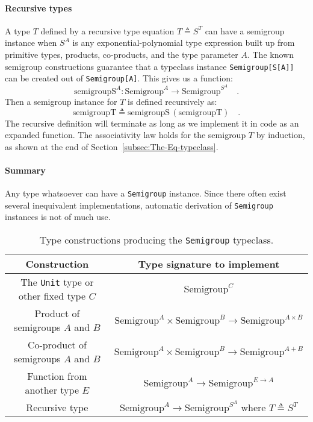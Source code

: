\paragraph{Recursive types}

A type $T$ defined by a recursive type equation $T\triangleq S^{T}$
can have a semigroup instance when $S^{A}$ is any exponential-polynomial
type expression built up from primitive types, products, co-products,
and the type parameter $A$. The known semigroup constructions guarantee
that a typeclass instance \lstinline!Semigroup[S[A]]! can be created
out of \lstinline!Semigroup[A]!. This gives us a function:
\[
\text{semigroupS}^{A}:\text{Semigroup}^{A}\rightarrow\text{Semigroup}^{S^{A}}\quad.
\]
Then a semigroup instance for $T$ is defined recursively as:
\[
\text{semigroupT}\triangleq\text{semigroupS}\,(\text{semigroupT})\quad.
\]
The recursive definition will terminate as long as we implement it
in code as an expanded function. The associativity law holds for the
semigroup $T$ by induction, as shown at the end of Section~\ref{subsec:The-Eq-typeclass}.

\paragraph{Summary}

Any type whatsoever can have a \lstinline!Semigroup! instance. Since
there often exist several inequivalent implementations, automatic
derivation of \lstinline!Semigroup! instances is not of much use.

\begin{table}
\begin{centering}
\begin{tabular}{|c|c|}
\hline 
\textbf{\footnotesize{}Construction} & \textbf{\footnotesize{}Type signature to implement}\tabularnewline
\hline 
\hline 
{\footnotesize{}The }\lstinline!Unit!{\footnotesize{} type or other
fixed type $C$} & {\footnotesize{}$\text{Semigroup}^{C}$}\tabularnewline
\hline 
{\footnotesize{}Product of semigroups $A$ and $B$} & {\footnotesize{}$\text{Semigroup}^{A}\times\text{Semigroup}^{B}\rightarrow\text{Semigroup}^{A\times B}$}\tabularnewline
\hline 
{\footnotesize{}Co-product of semigroups $A$ and $B$} & {\footnotesize{}$\text{Semigroup}^{A}\times\text{Semigroup}^{B}\rightarrow\text{Semigroup}^{A+B}$}\tabularnewline
\hline 
{\footnotesize{}Function from another type $E$} & {\footnotesize{}$\text{Semigroup}^{A}\rightarrow\text{Semigroup}^{E\rightarrow A}$}\tabularnewline
\hline 
{\footnotesize{}Recursive type} & {\footnotesize{}$\text{Semigroup}^{A}\rightarrow\text{Semigroup}^{S^{A}}$
where $T\triangleq S^{T}$}\tabularnewline
\hline 
\end{tabular}
\par\end{centering}
\caption{Type constructions producing the \lstinline!Semigroup! typeclass.\label{tab:Type-constructions-for-semigroup}}
\end{table}


